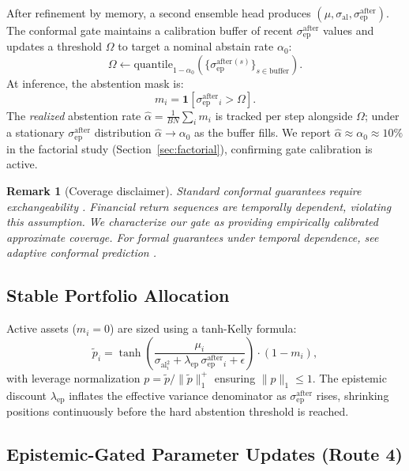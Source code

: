\documentclass[11pt,a4paper]{article}
\newtheorem{remark}{Remark}
\newcommand{\sal}{\sigma_{\mathrm{al}}}
\newcommand{\sepa}{\sigma_{\mathrm{ep}}^{\mathrm{after}}}
\begin{document}
After refinement by memory, a second ensemble head produces $(\mu, \sal, \sepa)$.
The conformal gate maintains a calibration buffer of recent $\sepa$ values and
updates a threshold $\Omega$ to target a nominal abstain rate $\alpha_0$:
\begin{equation}
  \Omega \gets \mathrm{quantile}_{1 - \alpha_0}(\{\sepa^{(s)}\}_{s \in \text{buffer}}).
\end{equation}
At inference, the abstention mask is:
\begin{equation}
  m_i = \mathbf{1}[\sepa_i > \Omega].
\end{equation}
The \emph{realized} abstention rate $\hat{\alpha} = \frac{1}{BN}\sum_i m_i$
is tracked per step alongside $\Omega$; under a stationary $\sepa$ distribution
$\hat{\alpha} \to \alpha_0$ as the buffer fills.  We report $\hat{\alpha} \approx
\alpha_0 \approx 10\%$ in the factorial study (Section~\ref{sec:factorial}),
confirming gate calibration is active.

\begin{remark}[Coverage disclaimer]
Standard conformal guarantees require exchangeability \citep{vovk2005algorithmic}.
Financial return sequences are temporally dependent, violating this assumption.
We characterize our gate as providing \emph{empirically calibrated approximate
coverage}.  For formal guarantees under temporal dependence, see adaptive
conformal prediction \citep{gibbs2021adaptive}.
\end{remark}

\subsection{Stable Portfolio Allocation}
\label{sec:allocation}

Active assets ($m_i = 0$) are sized using a tanh-Kelly formula:
\begin{equation}
  \tilde{p}_i = \tanh\!\left(
    \frac{\mu_i}{\sal_i^2 + \lambda_{\mathrm{ep}}\,\sepa_i + \epsilon}
  \right) \cdot (1 - m_i),
\end{equation}
with leverage normalization $p = \tilde{p} / \|\tilde{p}\|_1^+$ ensuring
$\|p\|_1 \le 1$.  The epistemic discount $\lambda_{\mathrm{ep}}$ inflates the
effective variance denominator as $\sepa$ rises, shrinking positions
continuously before the hard abstention threshold is reached.

\subsection{Epistemic-Gated Parameter Updates (Route 4)}
\label{sec:online_update}
\end{document}
